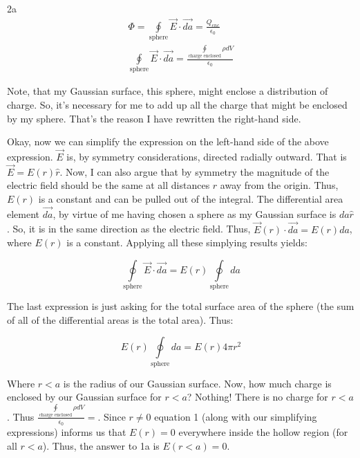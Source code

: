 \begin{homeworkProblem}[Quiz 3, Pr. 2]
\begin{homeworkSection}{2a}
        \begin{align}
            \label{}
            \Phi = \oint\limits_{\text{sphere}} \vec{E}\cdot\vec{da} =
            \frac{Q_{enc}}{\epsilon_0} \nonumber \\
            \oint\limits_{\text{sphere}} \vec{E}\cdot\vec{da} =
            \frac{\oint\limits_{\text{charge enclosed}}\rho dV}{\epsilon_0}
        \end{align}

        Note, that my Gaussian surface, this sphere, might enclose a
        distribution of charge. So, it's necessary for me to add up all
        the charge that might be enclosed by my sphere. That's the
        reason I have rewritten the right-hand side.

        Okay, now we can simplify the expression on the left-hand side
        of the above expression. $\vec{E}$ is, by symmetry
        considerations, directed radially outward. That is $\vec{E} =
        E(r) \hat{r}$. Now, I can also argue that by symmetry the
        magnitude of the electric field should be the same at all
        distances $r$ away from the origin. Thus, $E(r)$ is a constant
        and can be pulled out of the integral. The differential area
        element $\vec{da}$, by virtue of me having chosen a sphere as my
        Gaussian surface is $da \hat{r}$. So, it is in the same
        direction as the electric field. Thus, $\vec{E}(r) \cdot
        \vec{da} = E(r) da$, where $E(r)$ is a constant. Applying all
        these simplying results yields:

        \[
        \oint\limits_{\text{sphere}} \vec{E}\cdot\vec{da} = E(r)
        \oint\limits_{\text{sphere}} da
        \]

        The last expression is just asking for the total surface area of
        the sphere (the sum of all of the differential areas is the
        total area). Thus:
        
        \[
        E(r) \oint\limits_{\text{sphere}} da = E(r) 4\pi r^2
        \]

        Where $r<a$ is the radius of our Gaussian surface. Now, how much
        charge is enclosed by our Gaussian surface for $r<a$? Nothing!
        There is no charge for $r<a$. Thus
        $\frac{\oint\limits_{\text{charge enclosed}}\rho dV}{\epsilon_0} = $.
        Since $r \ne 0$ equation 1 (along with our simplifying
        expressions) informs us that $E(r)=0$ everywhere inside the
        hollow region (for all $r<a$). Thus, the answer to 1a is $E(r<a)
        = 0$.


\end{homeworkSection}
\end{homeworkProblem}
